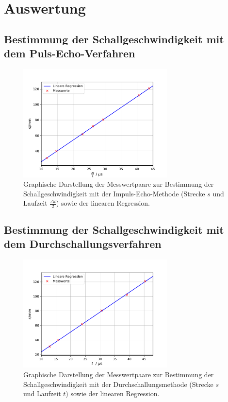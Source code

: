 \section{Auswertung}

\subsection{Bestimmung der Schallgeschwindigkeit mit dem Puls-Echo-Verfahren}



\begin{figure}[H]
  \centering
  \includegraphics[width = 0.7\textwidth]{../Messdaten/plots/schallgeschwindigkeit.pdf}
  \caption{Graphische Darstellung der Messwertpaare zur Bestimmung der Schallgeschwindigkeit
  mit der Impuls-Echo-Methode (Strecke $s$ und Laufzeit $\frac{\Delta t}{2}$) sowie der linearen Regression.}
  \label{fig: c_echo}
\end{figure}


\subsection{Bestimmung der Schallgeschwindigkeit mit dem Durchschallungsverfahren}



\begin{figure}[H]
  \centering
  \includegraphics[width = 0.7\textwidth]{../Messdaten/plots/schallgeschwindigkeit_durchschallung.pdf}
  \caption{Graphische Darstellung der Messwertpaare zur Bestimmung der Schallgeschwindigkeit
  mit der Durchschallungsmethode (Strecke $s$ und Laufzeit $t$) sowie der linearen Regression.}
  \label{fig: c_durchsschallung}
\end{figure}


